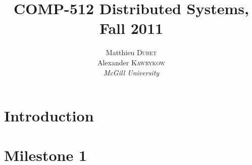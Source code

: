 \documentclass[a4paper]{article}
\title{COMP-512 Distributed Systems, Fall 2011}
\author{
Matthieu \textsc{Dubet} \\
Alexander \textsc{Kawrykow} \\
\emph{McGill University}
}
\begin{document}
\maketitle
\clearpage
\tableofcontents
\clearpage
\section{Introduction}
\section{Milestone 1}

%
%
\end{document}
